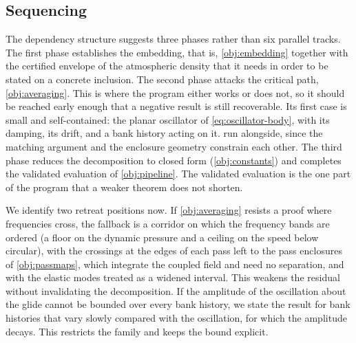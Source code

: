 \documentclass[english,11pt]{extarticle}
\begin{document}
\subsection{Sequencing}
The dependency structure suggests three phases rather than six parallel
tracks. The first phase establishes the embedding, that is,
\cref{obj:embedding} together with the certified envelope of the atmospheric
density that it needs in order to be stated on a concrete inclusion. The
second phase attacks the critical path, \cref{obj:averaging}. This is where
the program either works or does not, so it should be reached early enough
that a negative result is still recoverable. Its first case is small and
self-contained: the planar oscillator of \cref{eq:oscillator-body}, with its
damping, its drift, and a bank history acting on it.
 run alongside, since the matching
argument and the enclosure geometry constrain each other. The third phase
reduces the decomposition to closed form (\cref{obj:constants}) and
completes the validated evaluation of \cref{obj:pipeline}. The validated
evaluation is the one part of the program that a weaker theorem does not
shorten.

We identify two retreat positions now. If \cref{obj:averaging} resists a
proof where frequencies cross, the fallback is a corridor on which the
frequency bands are ordered (a floor on the dynamic pressure and a ceiling
on the speed below circular), with the crossings at the edges of each pass
left to the pass enclosures of \cref{obj:passmaps}, which integrate the
coupled field and need no separation, and with the elastic modes treated as
a widened interval. This weakens the residual without invalidating the
decomposition. If the amplitude of the oscillation about the glide cannot be
bounded over every bank history, we state the result for bank histories that
vary slowly compared with the oscillation, for which the amplitude decays.
This restricts the family and keeps the bound explicit.

\printbibliography[title={References}]
\end{document}
